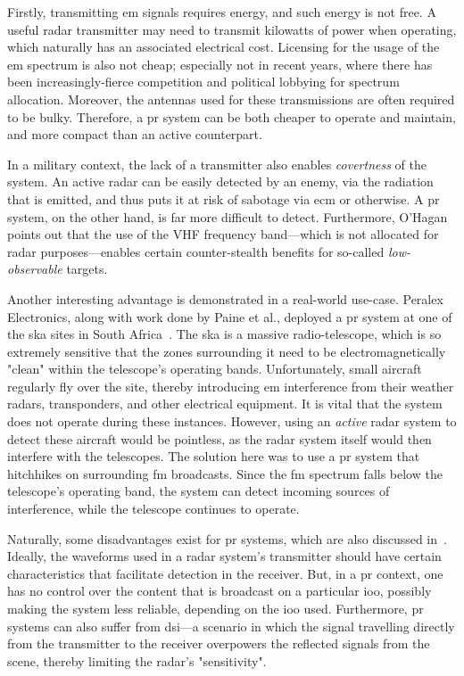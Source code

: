 \documentclass[class=report,11pt,crop=false]{standalone}
\begin{document}
Firstly, transmitting \gls{em} signals requires energy, and such energy is not free. A useful radar transmitter may need to transmit kilowatts of power when operating, which naturally has an associated electrical cost. Licensing for the usage of the \gls{em} spectrum is also not cheap; especially not in recent years, where there has been increasingly-fierce competition and political lobbying for spectrum allocation. Moreover, the antennas used for these transmissions are often required to be bulky. Therefore, a \gls{pr} system can be both cheaper to operate and maintain, and more compact than an active counterpart.

In a military context, the lack of a transmitter also enables \emph{covertness} of the system. An active radar can be easily detected by an enemy, via the radiation that is emitted, and thus puts it at risk of sabotage via \gls{ecm} or otherwise. A \gls{pr} system, on the other hand, is far more difficult to detect. Furthermore, O'Hagan points out that the use of the VHF frequency band---which is not allocated for radar purposes---enables certain counter-stealth benefits for so-called \emph{low-observable} targets.

Another interesting advantage is demonstrated in a real-world use-case. Peralex Electronics, along with work done by Paine et al., deployed a \gls{pr} system at one of the \gls{ska} sites in South Africa~\cite{Paine2018}. The \gls{ska} is a massive radio-telescope, which is so extremely sensitive that the zones surrounding it need to be electromagnetically "clean" within the telescope's operating bands. Unfortunately, small aircraft regularly fly over the site, thereby introducing \gls{em} interference from their weather radars, transponders, and other electrical equipment. It is vital that the system does not operate during these instances. However, using an \emph{active} radar system to detect these aircraft would be pointless, as the radar system itself would then interfere with the telescopes. The solution here was to use a \gls{pr} system that hitchhikes on surrounding \gls{fm} broadcasts. Since the \gls{fm} spectrum falls below the telescope's operating band, the system can detect incoming sources of interference, while the telescope continues to operate.

Naturally, some disadvantages exist for \gls{pr} systems, which are also discussed in~\cite{o2009passive}. Ideally, the waveforms used in a radar system's transmitter should have certain characteristics that facilitate detection in the receiver. But, in a \gls{pr} context, one has no control over the content that is broadcast on a particular \gls{ioo}, possibly making the system less reliable, depending on the \gls{ioo} used. Furthermore, \gls{pr} systems can also suffer from \gls{dsi}---a scenario in which the signal travelling directly from the transmitter to the receiver overpowers the reflected signals from the scene, thereby limiting the radar's "sensitivity".
\end{document}
